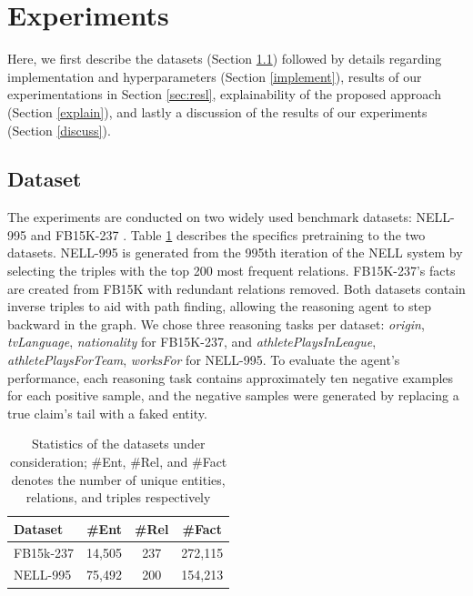 \section{Experiments}\label{experiments}

Here, we first describe the datasets (Section \ref{subsec:data}) followed by details regarding implementation and hyperparameters (Section \ref{implement}), results of our experimentations in Section \ref{sec:resl}, explainability of the proposed approach (Section \ref{explain}), and lastly a discussion of the results of our experiments (Section \ref{discuss}).

\subsection{Dataset}\label{subsec:data}


The experiments are conducted on two widely used benchmark datasets: NELL-995 \cite{Xiong2017} and FB15K-237 \cite{Toutanova2015}. Table \ref{table:KGstats} describes the specifics pretraining to the two datasets. NELL-995 is generated from the 995th iteration of the NELL system \cite{Carlson2010} by selecting the triples with the top 200 most frequent relations. FB15K-237's facts are created from FB15K \cite{Bordes2013} with redundant relations removed. Both datasets contain inverse triples to aid with path finding, allowing the reasoning agent to step backward in the graph. %
We chose three reasoning tasks per dataset: \textit{origin}, \textit{tvLanguage}, \textit{nationality} for FB15K-237, and \textit{athletePlaysInLeague}, \textit{athletePlaysForTeam}, \textit{worksFor} for NELL-995.
To evaluate the agent's performance, each reasoning task contains approximately ten negative examples for each positive sample, and the negative samples were generated by replacing a true claim's tail with a faked entity.

\begin{table}[h!]
\centering
\caption{Statistics of the datasets under consideration; \#Ent, \#Rel, and \#Fact denotes the number of unique entities, relations, and triples respectively}\label{Tbl:datatable}
\begin{tabular}{|l|c|c|c|}
\hline 
Dataset   & \#Ent & \#Rel & \#Fact  \\ \hline
FB15k-237 & 14,505                        & 237   & 272,115 \\ \hline
NELL-995  & 75,492                        & 200   & 154,213 \\ \hline
\end{tabular}
\label{table:KGstats}
\end{table}



